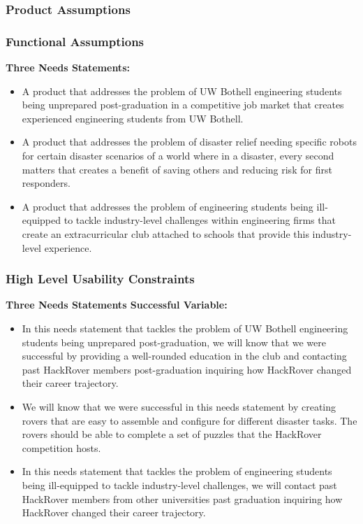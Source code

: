 \documentclass[a4paper, 10pt]{article}
\begin{document}
		\subsubsection{Product Assumptions}
		\subsubsection{Functional Assumptions}
		\textbf{Three Needs Statements:}

\begin{itemize}
\item		
A product that addresses the problem of UW Bothell engineering students being unprepared post-graduation in a competitive job market that creates experienced engineering students from UW Bothell.

\item
A product that addresses the problem of disaster relief needing specific robots for certain disaster scenarios of a world where in a disaster, every second matters that creates a benefit of saving others and reducing risk for first responders.

\item
A product that addresses the problem of engineering students being ill-equipped to tackle industry-level challenges within engineering firms that create an extracurricular club attached to schools that provide this industry-level experience. 
\end{itemize}

		\subsubsection{High Level Usability Constraints}
			\textbf{Three Needs Statements Successful Variable:}

\begin{itemize}
\item
In this needs statement that tackles the problem of UW Bothell engineering students being unprepared post-graduation, we will know that we were successful by providing a well-rounded education in the club and contacting past HackRover members post-graduation inquiring how HackRover changed their career trajectory.

\item
We will know that we were successful in this needs statement by creating rovers that are easy to assemble and configure for different disaster tasks. The rovers should be able to complete a set of puzzles that the HackRover competition hosts.

\item
In this needs statement that tackles the problem of engineering students being ill-equipped to tackle industry-level challenges, we will contact past HackRover members from other universities past graduation inquiring how HackRover changed their career trajectory. 
\end{itemize}
\end{document}
